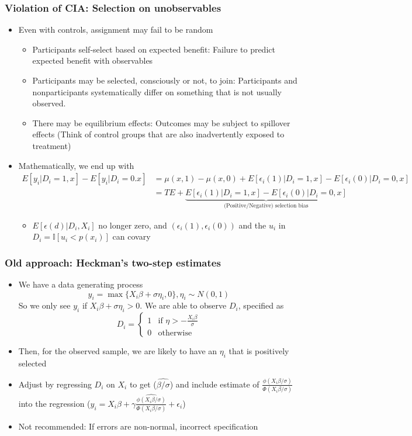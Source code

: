 \documentclass[aspectratio=169]{beamer}
\begin{document}
\begin{frame}
\frametitle{Violation of CIA: Selection on unobservables}
\begin{itemize}
\item Even with controls, assignment may fail to be random
\begin{itemize}
\item Participants self-select based on expected benefit: Failure to predict expected benefit with observables
\item Participants may be selected, consciously or not, to join: Participants and nonparticipants systematically differ on something that is not usually observed.
\item There may be equilibrium effects: Outcomes may be subject to spillover effects (Think of control groups that are also inadvertently exposed to treatment)
\end{itemize}
\item Mathematically, we end up with
\small{\begin{align*}
E[y_i|D_i=1,x]-E[y_i|D_i=0.x]&=\mu(x,1)-\mu(x,0)+E[\epsilon_i(1)|D_i=1,x]-E[\epsilon_i(0)|D_i=0,x]\\
&=TE+\underbrace{E[\epsilon_i(1)|D_i=1,x]-E[\epsilon_i(0)|D_i=0,x]}_{\text{(Positive/Negative) selection bias}}
\end{align*}}\normalsize
\begin{itemize}
\item $E[\epsilon(d)|D_i, X_i]$ no longer zero, and $(\epsilon_i(1), \epsilon_i(0))$ and the $u_i$ in $D_i=\mathbb{I}[u_i<p(x_i)]$ can covary
\end{itemize}
\end{itemize}
\end{frame}

\begin{frame}
\frametitle{Old approach: Heckman's two-step estimates}
\begin{itemize}
\item We have a data generating process
\[
y_i = \max\{X_i\beta+\sigma\eta_i, 0\}, \eta_i \sim N(0,1)
\]
So we only see $y_i$ if $X_i\beta+\sigma\eta_i>0$. We are able to observe $D_i$, specified as
\[
D_i=\begin{cases}1 & \text{if }\eta>-\frac{X_i\beta}{\sigma}\\ 0 & \text{otherwise} \end{cases}
\]
\item Then, for the observed sample, we are likely to have an $\eta_i$ that is positively selected
\item Adjust by regressing $D_i$ on $X_i$ to get ($\widehat{\beta/\sigma}$) and include estimate of $\frac{\phi(X_i\beta/\sigma)}{\Phi(X_i\beta/\sigma)}$ into the regression ($y_i = X_i\beta+ \gamma\widehat{\frac{\phi(X_i\beta/\sigma)}{\Phi(X_i\beta/\sigma)}}+\epsilon_i$)
\item Not recommended: If errors are non-normal, incorrect specification
\end{itemize}
\end{frame}
\end{document}
